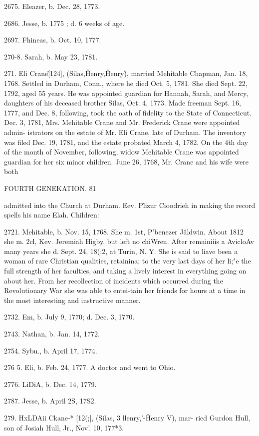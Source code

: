 2675. Eleazer, b. Dec. 28, 1773. 

2686. Jesse, b. 1775 ; d. 6 weeks of age. 

2697. Fhineas, b. Oct. 10, 1777. 

270-8. Sarah, b. May 23, 1781. 

271. Eli Crane\^ [124], (Silas,\^ Henry,\^ Henry\^), married 
Mehitable Chapman, Jan. 18, 1768. Settled in Durham, Conn., 
where he died Oct. 5, 1781. She died Sept. 22, 1792, aged 55 
years. He was appointed guardian for Hannah, Sarah, and 
Mercy, daughters of his deceased brother Silas, Oct. 4, 1773. 
Made freeman Sept. 16, 1777, and Dec. 8, following, took the 
oath of fidelity to the State of Connecticut. Dec. 3, 1781, Mrs. 
Mehitable Crane and Mr. Frederick Crane were appointed admin- 
istrators on the estate of Mr. Eli Crane, late of Durham. The 
inventory was filed Dec. 19, 1781, and the estate probated March 
4, 1782. On the 4th day of the month of November, following, 
widow Mehitable Crane was appointed guardian for her six minor 
children. June 26, 1768, Mr. Crane and his wife were both 



FOURTH GENEKATION. 81 

admitted into the Church at Durham. Eev. P\^lizur Cioodrieh in 
making the record spells his name Elah. Children: 

2721. Mehitable, b. Nov. 15, 1768. She m. 1st, P'benezer J\^aldwin. 
About 1812 she m. 2cl, Kev. Jeremiah Higby, but left no 
chiWren. After remainiiis a AvicloAv many years she d. Sept. 
24, 18(;2, at Turin, N. Y. She is said to liave been a woman 
of rare Christian qualities, retainina; to the very last days 
of her li;"e the full strength of her faculties, and taking a 
lively interest in everything going on about her. From 
her recollection of incidents which occurred during the 
Revolutionary War she was able to entei-tain her friends 
for hours at a time in the most interesting and instructive 
manner. 

2732. Em, b. July 9, 1770; d. Dec. 3, 1770. 

2743. Nathan, b. Jan. 14, 1772. 

2754. Sybu., b. April 17, 1774. 

276  5. Eli, b. Feb. 24, 1777. A doctor and went to Ohio. 

2776. LiDiA, b. Dec. 14, 1779. 

2787. Jesse, b. April 2S, 17S2. 

279. HxLDAii Ckane-* [12(;], (Silas, 3 llenry,'-\^ Henry V), mar- 
ried Gurdon Hull, son of Josiah Hull, Jr., Nov'. 10, 177*3. 

